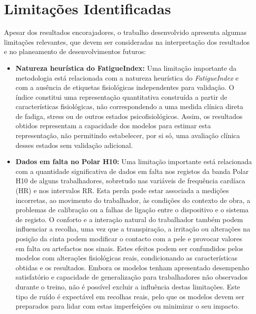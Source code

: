 \section{Limitações Identificadas}
\label{sec:limitacoes}

Apesar dos resultados encorajadores, o trabalho desenvolvido apresenta algumas limitações relevantes, que devem ser consideradas na interpretação dos resultados e no planeamento de desenvolvimentos futuros:

\begin{itemize}
\item \textbf{Natureza heurística do FatigueIndex:} 
Uma limitação importante da metodologia está relacionada com a natureza heurística do \textit{FatigueIndex} e com a ausência de etiquetas fisiológicas independentes para validação. O índice constitui uma representação quantitativa construída a partir de características fisiológicas, não correspondendo a uma medida clínica direta de fadiga, stress ou de outros estados psicofisiológicos. Assim, os resultados obtidos representam a capacidade dos modelos para estimar esta representação, não permitindo estabelecer, por si só, uma avaliação clínica desses estados sem validação adicional.

\item \textbf{Dados em falta no Polar H10:} 
Uma limitação importante está relacionada com a quantidade significativa de dados em falta nos registos da banda Polar H10 de alguns trabalhadores, sobretudo nas variáveis de frequência cardíaca (HR) e nos intervalos RR. Esta perda pode estar associada a medições incorretas, ao movimento do trabalhador, às condições do contexto de obra, a problemas de calibração ou a falhas de ligação entre o dispositivo e o sistema de registo. O conforto e a interação natural do trabalhador também podem influenciar a recolha, uma vez que a transpiração, a irritação ou alterações na posição da cinta podem modificar o contacto com a pele e provocar valores em falta ou artefactos nos sinais. Estes efeitos podem ser confundidos pelos modelos com alterações fisiológicas reais, condicionando as características obtidas e os resultados. Embora os modelos tenham apresentado desempenho satisfatório e capacidade de generalização para trabalhadores não observados durante o treino, não é possível excluir a influência destas limitações. Este tipo de ruído é expectável em recolhas reais, pelo que os modelos devem ser preparados para lidar com estas imperfeições ou minimizar o seu impacto.


\end{itemize}
